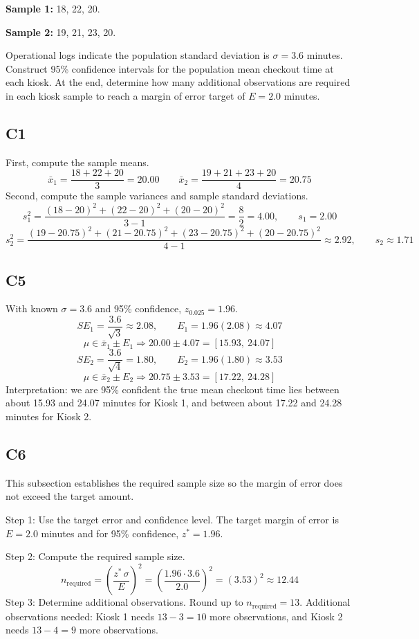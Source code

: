 \begin{ExamProblems}
		\textbf{Sample 1:} 18, 22, 20.

		\textbf{Sample 2:} 19, 21, 23, 20.

		Operational logs indicate the population standard deviation is $\sigma = 3.6$ minutes.
		Construct 95\% confidence intervals for the population mean checkout time at each kiosk.
		At the end, determine how many additional observations are required in each kiosk sample to reach a margin of error target of $E = 2.0$ minutes.

		\subsection*{C1}
		First, compute the sample means.
		\[
		\bar{x}_1 = \frac{18 + 22 + 20}{3} = 20.00
		\qquad
		\bar{x}_2 = \frac{19 + 21 + 23 + 20}{4} = 20.75
		\]
		Second, compute the sample variances and sample standard deviations.
		\[
		s_1^2 = \frac{(18-20)^2 + (22-20)^2 + (20-20)^2}{3-1} = \frac{8}{2} = 4.00,
		\qquad s_1 = 2.00
		\]
		\[
		s_2^2 = \frac{(19-20.75)^2 + (21-20.75)^2 + (23-20.75)^2 + (20-20.75)^2}{4-1} \approx 2.92,
		\qquad s_2 \approx 1.71
		\]

		\subsection*{C5}
		With known $\sigma = 3.6$ and 95\% confidence, $z_{0.025}=1.96$.
		\[
		SE_1 = \frac{3.6}{\sqrt{3}} \approx 2.08, \qquad E_1 = 1.96(2.08) \approx 4.07
		\]
		\[
		\mu \in \bar{x}_1 \pm E_1 \Rightarrow 20.00 \pm 4.07 = [15.93,\ 24.07]
		\]
		\[
		SE_2 = \frac{3.6}{\sqrt{4}} = 1.80, \qquad E_2 = 1.96(1.80) \approx 3.53
		\]
		\[
		\mu \in \bar{x}_2 \pm E_2 \Rightarrow 20.75 \pm 3.53 = [17.22,\ 24.28]
		\]
		Interpretation: we are 95\% confident the true mean checkout time lies between about 15.93 and 24.07 minutes for Kiosk 1, and between about 17.22 and 24.28 minutes for Kiosk 2.

		\subsection*{C6}
		This subsection establishes the required sample size so the margin of error does not exceed the target amount.

		Step 1: Use the target error and confidence level. The target margin of error is $E = 2.0$ minutes and for 95\% confidence, $z^* = 1.96$.

		Step 2: Compute the required sample size.
		\[
		n_{\text{required}} = \left(\frac{z^*\,\sigma}{E}\right)^2
		= \left(\frac{1.96 \cdot 3.6}{2.0}\right)^2
		= \left(3.53\right)^2
		\approx 12.44
		\]
		Step 3: Determine additional observations. Round up to $n_{\text{required}} = 13$.
		Additional observations needed: Kiosk 1 needs $13 - 3 = 10$ more observations, and Kiosk 2 needs $13 - 4 = 9$ more observations.


\end{ExamProblems}
